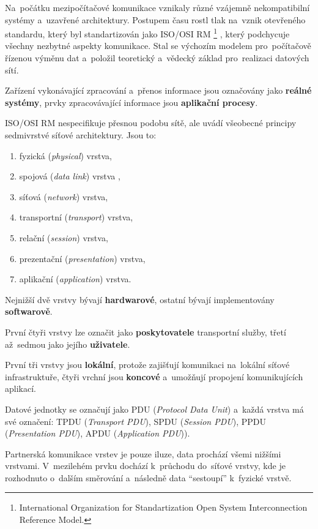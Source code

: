 Na~počátku mezipočítačové komunikace vznikaly různé vzájemně nekompatibilní systémy a~uzavřené architektury. Postupem času rostl tlak na~vznik otevřeného standardu, který byl standartizován jako ISO/OSI RM%
\footnote{International Organization for Standartization Open System Interconnection Reference Model.}%
, který podchycuje všechny nezbytné aspekty komunikace. Stal se výchozím modelem pro~počítačově řízenou výměnu dat a~položil teoretický a~vědecký základ pro~realizaci datových sítí.

Zařízení vykonávající zpracování a~přenos informace jsou označovány jako \textbf{reálné systémy}, prvky zpracovávající informace jsou \textbf{aplikační procesy}.

ISO/OSI RM nespecifikuje přesnou podobu sítě, ale uvádí všeobecné principy sedmivrstvé síťové architektury. Jsou to:

\begin{enumerate}
	\item fyzická (\emph{physical}) vrstva,
	\item spojová (\emph{data link}) vrstva ,
	\item síťová (\emph{network}) vrstva,
	\item transportní (\emph{transport}) vrstva,
	\item relační (\emph{session}) vrstva,
	\item prezentační (\emph{presentation}) vrstva,
	\item aplikační (\emph{application}) vrstva.
\end{enumerate}

Nejnižší dvě vrstvy bývají \textbf{hardwarové}, ostatní bývají implementovány \textbf{softwarově}.

První čtyři vrstvy lze označit jako \textbf{poskytovatele} transportní služby, třetí až~sedmou jako jejího \textbf{uživatele}.

První tři vrstvy jsou \textbf{lokální}, protože zajišťují komunikaci na~lokální síťové infrastruktuře, čtyři vrchní jsou \textbf{koncové} a~umožňují propojení komunikujících aplikací.

Datové jednotky se označují jako PDU (\emph{Protocol Data Unit}) a~každá vrstva má své označení: TPDU (\emph{Transport PDU}), SPDU (\emph{Session PDU}), PPDU (\emph{Presentation PDU}), APDU (\emph{Application PDU})).

Partnerská komunikace vrstev je pouze iluze, data prochází všemi nižšími vrstvami. V~mezilehém prvku dochází k~průchodu do~síťové vrstvy, kde je rozhodnuto o~dalším směrování a~následně data \enquote{sestoupí} k~fyzické vrstvě.

